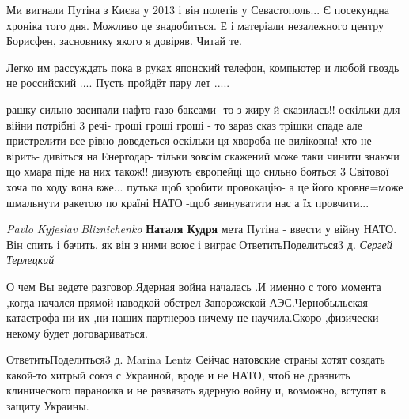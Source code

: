 \begin{itemize}

Ми вигнали Путіна з Києва у 2013 і він полетів у Севастополь... Є посекундна
хроніка того дня. Можливо це знадобиться. Е і матеріали незалежного центру
Борисфен, засновнику якого я довіряв. Читай те.


Легко им рассуждать пока в руках японский телефон, компьютер и любой гвоздь не
российский .... Пусть пройдёт пару лет .....


рашку сильно засипали нафто-газо баксами- то з жиру й сказилась!! оскільки для
війни потрібні 3 речі- гроші гроші гроші - то зараз сказ трішки спаде але
пристрелити все рівно доведеться оскільки ця хвороба не виліковна! хто не
вірить- дивіться на Енергодар- тільки зовсім скажений може таки чинити знаючи
що хмара піде на них також!! дивують європейці що сильно бояться 3 Світової
хоча по ходу вона вже... путька щоб зробити провокацію- а це його кровне=може
шмальнути ракетою по країні НАТО -щоб звинуватити нас а їх провчити...

\emph{Pavlo Kyjeslav Bliznichenko}
\textbf{Наталя Кудря} мета Путіна - ввести у війну НАТО. Він спить і бачить, як він з ними воює і виграє
ОтветитьПоделиться3 д.
\emph{Сергей Терлецкий}

О чем Вы ведете разговор.Ядерная война началась .И именно с того момента ,когда
начался прямой наводкой обстрел Запорожской АЭС.Чернобыльская катастрофа ни их
,ни наших партнеров ничему не научила.Скоро ,физически некому будет
договариваться.

ОтветитьПоделиться3 д.
Marina Lentz
Сейчас натовские страны хотят создать какой-то хитрый союз с Украиной, вроде и не НАТО, чтоб не дразнить клинического параноика и не развязать ядерную войну и, возможно, вступят в защиту Украины.

\end{itemize} %
